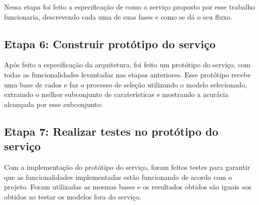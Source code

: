 Nessa etapa foi feito a especificação de como o serviço proposto por esse trabalho funcionaria, descrevendo cada uma de suas fases e como se dá o seu fluxo.

\subsection{Etapa 6: Construir protótipo do serviço}

Após feito a especificação da arquitetura, foi feito um protótipo do serviço, com todas as funcionalidades levantadas nas etapas anteriores. Esse protótipo recebe uma base de cados e faz o processo de seleção utilizando o modelo selecionado, extraindo o melhor subconjunto de caraterísticas e mostrando a acurácia alcançada por esse subconjunto.

\subsection{Etapa 7: Realizar testes no protótipo do serviço}
Com a implementação do protótipo do serviço, foram feitos testes para garantir que as funcionalidades implementadas estão funcionando de acordo com o projeto. Foram utilizadas as mesmas bases e os resultados obtidos são iguais aos obtidos ao testar os modelos fora do serviço.
